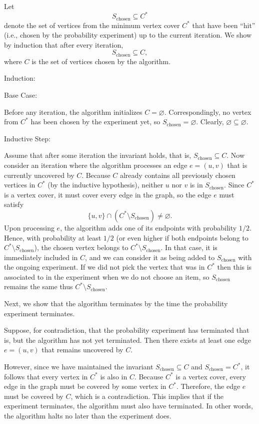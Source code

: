 \documentclass[12pt, letterpaper]{article}
\renewcommand{\t}[1]{\text{#1}}
\begin{document}
\begin{problemproof} 
  Let 
  \[
  S_{\text{chosen}} \subseteq C^*
  \]
  denote the set of vertices from the minimum vertex cover \(C^*\) that have been “hit” (i.e., chosen by the probability experiment) up to the current iteration. We show by induction that after every iteration,  
  \[
  S_{\text{chosen}} \subseteq C,
  \]
  where \(C\) is the set of vertices chosen by the algorithm.

  Induction:

  Base Case:

  Before any iteration, the algorithm initializes \( C = \varnothing \). Correspondingly, no vertex from \(C^*\) has been chosen by the experiment yet, so \( S_{\text{chosen}} = \varnothing \). Clearly, \(\varnothing \subseteq \varnothing\).

  Inductive Step:

  Assume that after some iteration the invariant holds, that is, \(S_{\text{chosen}} \subseteq C\). Now consider an iteration where the algorithm processes an edge \(e = (u,v)\) that is currently uncovered by \(C\). Because \(C\) already contains all previously chosen vertices in \(C^*\) (by the inductive hypothesis), neither \(u\) nor \(v\) is in \(S_{\text{chosen}}\). Since \(C^*\) is a vertex cover, it must cover every edge in the graph, so the edge \(e\) must satisfy 
  \[
  \{u,v\} \cap (C^* \setminus S_{\text{chosen}}) \neq \varnothing.
  \]
  Upon processing \(e\), the algorithm adds one of its endpoints with probability \(1/2\). Hence, with probability at least \(1/2\) (or even higher if both endpoints belong to \(C^* \setminus S_{\text{chosen}}\)), the chosen vertex belongs to \(C^*\setminus S_{\text{chosen}}\). In that case, it is immediately included in \(C\), and we can consider it as being added to \(S_{\text{chosen}}\) with the ongoing experiment. If we did not pick the vertex that was in $C^*$ then this is associated to in the experiment when we do not choose an item, so $S_{\t{chosen}}$ remains the same thus \(C^*\setminus S_{\text{chosen}}\).
 
  Next, we show that the algorithm terminates by the time the probability experiment terminates.

  Suppose, for contradiction, that the probability experiment has terminated that is, but the algorithm has not yet terminated. Then there exists at least one edge \(e=(u,v)\) that remains uncovered by \(C\).

  However, since we have maintained the invariant \(S_{\text{chosen}} \subseteq C\) and \(S_{\text{chosen}} = C^*\), it follows that every vertex in \(C^*\) is also in \(C\). Because \(C^*\) is a vertex cover, every edge in the graph must be covered by some vertex in \(C^*\). Therefore, the edge \(e\) must be covered by \(C\), which is a contradiction. This implies that if the experiment terminates, the algorithm must also have terminated. In other words, the algorithm halts no later than the experiment does.


\end{problemproof}
\end{document}
